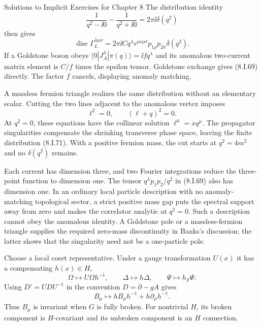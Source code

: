 \begin{bankssolutions}{Solutions to Implicit Exercises for Chapter 8}
The distribution identity
\[
 \frac1{q^2-\ii0}-\frac1{q^2+\ii0}
 =2\pi\ii\delta(q^2) \tag{8.I.70}
\]
then gives
\[
 \operatorname{disc}\Gamma_L^{\lambda\mu\nu}
 =2\pi\ii Cq^\lambda
 \epsilon^{\mu\nu\rho\sigma}p_{1\rho}p_{2\sigma}\delta(q^2). \tag{8.I.71}
\]
If a Goldstone boson obeys
$\langle0|J_A^\lambda|\pi(q)\rangle=\ii f q^\lambda$ and its anomalous
two-current matrix element is $C/f$ times the epsilon tensor, Goldstone
exchange gives (8.I.69) directly.  The factor $f$ cancels, displaying anomaly
matching.

A massless fermion triangle realizes the same distribution without an
elementary scalar.  Cutting the two lines adjacent to the anomalous vertex
imposes
\[
 \ell^2=0,\qquad (\ell+q)^2=0.
\]
At $q^2=0$, these equations have the collinear solution
$\ell^\mu=xq^\mu$.  The propagator singularities compensate the shrinking
transverse phase space, leaving the finite distribution (8.I.71).  With a
positive fermion mass, the cut starts at $q^2=4m^2$ and no
$\delta(q^2)$ remains.

Each current has dimension three, and two Fourier integrations reduce the
three-point function to dimension one.  The tensor
$q^\lambda p_1p_2/q^2$ in (8.I.69) also has dimension one.  In an ordinary
local particle description with no anomaly-matching topological sector, a
strict positive mass gap puts the spectral support away from zero and makes
the correlator analytic at $q^2=0$.  Such a description cannot obey the
anomalous identity.  A Goldstone pole or a massless-fermion triangle supplies
the required zero-mass discontinuity in Banks's discussion; the latter shows
that the singularity need not be a one-particle pole.

Choose a local coset representative.  Under a gauge transformation $U(x)$ it
has a compensating $h(x)\in H$,
\[
 \Omega\longmapsto U\Omega h^{-1},\qquad
 \Delta\longmapsto h\Delta,\qquad
 \Psi\longmapsto h_F\Psi.
\]
Using $D'=UDU^{-1}$ in the convention $D=\partial-gA$ gives
\[
 B_\mu\longmapsto hB_\mu h^{-1}+h\partial_\mu h^{-1}. \tag{8.I.71a}
\]
Thus $B_\mu$ is invariant when $G$ is fully broken.  For nontrivial $H$, its
broken component is $H$-covariant and its unbroken component is an
$H$ connection.


\end{bankssolutions}
